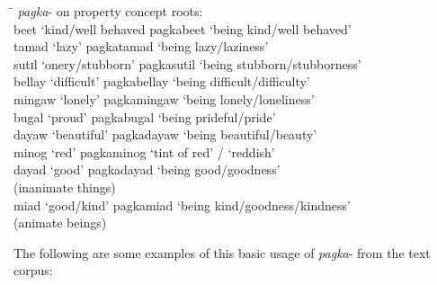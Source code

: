 \ea
\begin{tabbing}
\hspace{4cm} \= \kill
\textit{pagka}{}- on property concept roots: \\
beet ‘kind/well behaved \> pagkabeet ‘being kind/well behaved’ \\
tamad ‘lazy’ \> pagkatamad ‘being lazy/laziness’ \\
sutɪl ‘onery/stubborn’ \> pagkasutil ‘being stubborn/stubborness’ \\
bellay ‘difficult’ \> pagkabellay ‘being difficult/difficulty’ \\
mingaw ‘lonely’ \> pagkamingaw ‘being lonely/loneliness’ \\
bugal ‘proud’ \> pagkabugal ‘being prideful/pride’ \\
dayaw ‘beautiful’\>  pagkadayaw ‘being beautiful/beauty’ \\
minog ‘red’ \>   pagkaminog ‘tint of red’ / ‘reddish' \\
dayad ‘good’ \> pagkadayad ‘being good/goodness’ \\
\> (inanimate things) \\
miad ‘good/kind’ \> pagkamiad ‘being kind/goodness/kindness’ \\
\> (animate beings)
\end{tabbing}
\z

The following are some examples of this basic usage of \textit{pagka}{}- from the text corpus:

